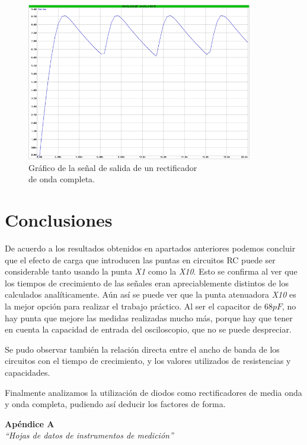 \documentclass{article}
\begin{document}
\newpage
\begin{figure}[h]
	\centering
	\includegraphics[width=0.88\textwidth]{images/4-4-8-grafico-circuito-rectificador-onda-completa-con-filtro.jpg}
	\medskip
	\caption{Gráfico de la señal de salida de un rectificador\\ de onda completa.}
\end{figure}
\bigskip\bigskip




\section{Conclusiones}

	De acuerdo a los resultados obtenidos en apartados anteriores podemos concluir que el efecto de carga que introducen las puntas en circuitos RC puede ser considerable tanto usando la punta \textit{X1} como la \textit{X10}. Esto se confirma al ver que los tiempos de crecimiento de las señales eran apreciablemente distintos de los calculados analíticamente. Aún así se puede ver que la punta atenuadora \textit{X10} es la mejor opción para realizar el trabajo práctico. Al ser el capacitor de $68 pF$, no hay punta que mejore las medidas realizadas mucho más, porque hay que tener en cuenta la capacidad de entrada del osciloscopio, que no se puede despreciar. 
	\par
	Se pudo observar también la relación directa entre el ancho de banda de los circuitos con el tiempo de crecimiento, y los valores utilizados de resistencias y capacidades. 
	\par
	Finalmente analizamos la utilización de diodos como rectificadores de media onda y onda completa, pudiendo así deducir los factores de forma.
\bigskip\bigskip


\newpage \textit{}
\newpage



\newpage
\vspace*{4cm}
\begin{center}
	\textbf{\Huge{Apéndice A}} \\
	\bigskip\bigskip
	\Large{\textit{``Hojas de datos de instrumentos de medición''}}
\end{center}


\newpage \textit{}
\newpage
\end{document}
